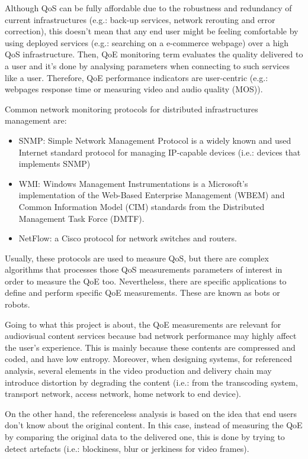Although QoS can be fully affordable due to the robustness and redundancy of current infrastructures (e.g.: back-up services, network rerouting and error correction), this doesn't mean that any end user might be feeling comfortable by using deployed services (e.g.: searching on a e-commerce webpage) over a high QoS infrastructure. Then, QoE monitoring term evaluates the quality delivered to a user and it's done by analysing parameters when connecting to such services like a user. Therefore, QoE performance indicators are user-centric (e.g.: webpages response time or measuring video and audio quality (MOS)).

Common network monitoring protocols for distributed infrastructures management are:

\begin{itemize}
\item SNMP: Simple Network Management Protocol is a widely known and used Internet standard protocol for managing IP-capable devices (i.e.: devices that implements SNMP)
\item WMI: Windows Management Instrumentations is a Microsoft's implementation of the Web-Based Enterprise Management (WBEM) and Common Information Model (CIM) standards from the Distributed Management Task Force (DMTF).
\item NetFlow: a Cisco protocol for network switches and routers.
\end{itemize}  

Usually, these protocols are used to measure QoS, but there are complex algorithms that processes those QoS measurements parameters of interest in order to measure the QoE too. Nevertheless, there are specific applications to define and perform specific QoE measurements. These are known as bots or robots.

Going to what this project is about, the QoE measurements are relevant for audiovisual content services because bad network performance may highly affect the user's experience. This is mainly because these contents are compressed and coded, and have low entropy. Moreover, when designing systems, for referenced analysis, several elements in the video production and delivery chain may introduce distortion by degrading the content (i.e.: from the transcoding system, transport network, access network, home network to end device).

On the other hand, the referenceless analysis is based on the idea that end users don't know about the original content. In this case, instead of measuring the QoE by comparing the original data to the delivered one, this is done by trying to detect artefacts (i.e.: blockiness, blur or jerkiness for video frames).


